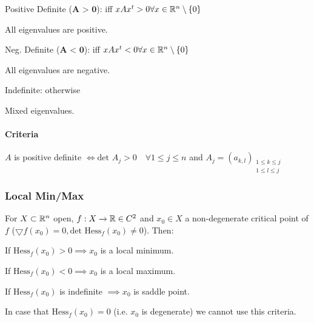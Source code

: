 \begin{compactdesc}
    \item[Positive Definite ($\textbf{A > 0}$):] iff $xAx^t > 0 \forall x \in \mathbb{R}^n \setminus \{0\}$
        \begin{compactitem}
            \item All eigenvalues are positive.
        \end{compactitem}
    \item[Neg. Definite ($\textbf{A < 0}$):] iff $xAx^t < 0 \forall x \in \mathbb{R}^n \setminus \{0\}$
        \begin{compactitem}
            \item All eigenvalues are negative.
        \end{compactitem}
    \item[Indefinite:] otherwise
        \begin{compactitem}
            \item Mixed eigenvalues.
        \end{compactitem}
\end{compactdesc}

\paragraph{Criteria}
$A$ is positive definite $\iff \text{det }A_j > 0 \quad \forall 1 \le j \le n$ and $A_j = (a_{k,l})_{\substack{1 \le k \le j\\ 1 \le l \le j}}$

\subsubsection{Local Min/Max}
For $X \subset \mathbb{R}^n$ open, $f: X \to \mathbb{R} \in C^2$ and $x_0 \in X$ a non-degenerate critical point of $f$ ($\bigtriangledown f(x_0) = 0, \text{det Hess}_f (x_0) \neq 0$). Then:
\begin{compactitem}
    \item If $\text{Hess}_f (x_0) > 0 \implies x_0$ is a local minimum.
    \item If $\text{Hess}_f (x_0) < 0 \implies x_0$ is a local maximum.
    \item If $\text{Hess}_f (x_0)$ is indefinite $\implies x_0$ is saddle point.
\end{compactitem}

In case that $\text{Hess}_f (x_0) = 0$ (i.e. $x_0$ is degenerate) we cannot use this criteria.

